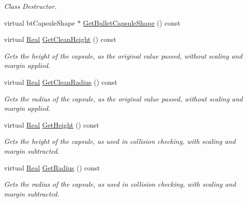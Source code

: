 \begin{DoxyCompactItemize}
\begin{DoxyCompactList}\small\item\em Class Destructor. \item\end{DoxyCompactList}\item 
virtual btCapsuleShape $\ast$ \hyperlink{classMezzanine_1_1CapsuleCollisionShape_ad9505b15fdcbd88231714992e5b3fc06}{GetBulletCapsuleShape} () const 
\item 
virtual \hyperlink{namespaceMezzanine_a726731b1a7df72bf3583e4a97282c6f6}{Real} \hyperlink{classMezzanine_1_1CapsuleCollisionShape_a531d88a3599327c7ed2a038190fe73e3}{GetCleanHeight} () const 
\begin{DoxyCompactList}\small\item\em Gets the height of the capsule, as the original value passed, without scaling and margin applied. \item\end{DoxyCompactList}\item 
virtual \hyperlink{namespaceMezzanine_a726731b1a7df72bf3583e4a97282c6f6}{Real} \hyperlink{classMezzanine_1_1CapsuleCollisionShape_ad1a0ca094872f1e9f403475165cc455b}{GetCleanRadius} () const 
\begin{DoxyCompactList}\small\item\em Gets the radius of the capsule, as the original value passed, without scaling and margin applied. \item\end{DoxyCompactList}\item 
virtual \hyperlink{namespaceMezzanine_a726731b1a7df72bf3583e4a97282c6f6}{Real} \hyperlink{classMezzanine_1_1CapsuleCollisionShape_a8913f5ead449383b519a682fb837d6e2}{GetHeight} () const 
\begin{DoxyCompactList}\small\item\em Gets the height of the capsule, as used in collision checking, with scaling and margin subtracted. \item\end{DoxyCompactList}\item 
virtual \hyperlink{namespaceMezzanine_a726731b1a7df72bf3583e4a97282c6f6}{Real} \hyperlink{classMezzanine_1_1CapsuleCollisionShape_a2b49207a067b52d65bd0129711c7f85a}{GetRadius} () const 
\begin{DoxyCompactList}\small\item\em Gets the radius of the capsule, as used in collision checking, with scaling and margin subtracted. \item\end{DoxyCompactList}\item 

\end{DoxyCompactItemize}
